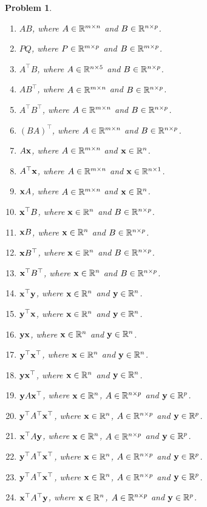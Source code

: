 \documentclass[twocolumn]{article}
\newtheorem{prob}{Problem}
\begin{document}
\begin{prob}
\begin{enumerate}
  \item $AB$, where $A \in \mathbb{R}^{m \times n}$ and $B \in \mathbb{R}^{n \times p}$.
  \item $PQ$, where $P \in \mathbb{R}^{m \times p}$ and $B \in \mathbb{R}^{m \times p}$.
  \item $A^\top B$, where $A \in \mathbb{R}^{n \times 5}$ and $B \in \mathbb{R}^{n \times p}$.
  \item $AB^\top$, where $A \in \mathbb{R}^{m \times n}$ and $B \in \mathbb{R}^{n \times p}$.
  \item $A^\top B^\top$, where $A \in \mathbb{R}^{m \times n}$ and $B \in \mathbb{R}^{n \times p}$.
  \item $(BA)^\top$, where $A \in \mathbb{R}^{m \times n}$ and $B \in \mathbb{R}^{n \times p}$.
  \item $A\mathbf{x}$, where $A \in \mathbb{R}^{m \times n}$ and $\mathbf{x} \in \mathbb{R}^{n}$.
  \item $A^\top\mathbf{x}$, where $A \in \mathbb{R}^{m \times n}$ and $\mathbf{x} \in \mathbb{R}^{n
      \times 1}$.
  \item $\mathbf{x} A$, where $A \in \mathbb{R}^{m \times n}$ and $\mathbf{x} \in \mathbb{R}^{n}$.
  \item $\mathbf{x}^\top B$, where $\mathbf{x} \in \mathbb{R}^{n}$ and $B \in \mathbb{R}^{n \times p}$.
  \item $\mathbf{x} B$, where $\mathbf{x} \in \mathbb{R}^{n}$ and $B \in \mathbb{R}^{n \times p}$.
  \item $\mathbf{x} B^\top$, where $\mathbf{x} \in \mathbb{R}^{n}$ and $B \in \mathbb{R}^{n \times p}$.
  \item $\mathbf{x}^\top B^\top$, where $\mathbf{x} \in \mathbb{R}^{n}$ and $B \in \mathbb{R}^{n \times p}$.
  \item $\mathbf{x}^\top \mathbf{y}$, where $\mathbf{x} \in \mathbb{R}^{n}$ and $\mathbf{y} \in \mathbb{R}^{n}$.
  \item $\mathbf{y}^\top \mathbf{x}$, where $\mathbf{x} \in \mathbb{R}^{n}$ and $\mathbf{y} \in \mathbb{R}^{n}$.
  \item $\mathbf{y} \mathbf{x}$, where $\mathbf{x} \in \mathbb{R}^{n}$ and $\mathbf{y} \in \mathbb{R}^{n}$.
  \item $\mathbf{y}^\top \mathbf{x}^\top$, where $\mathbf{x} \in \mathbb{R}^{n}$ and $\mathbf{y} \in \mathbb{R}^{n}$.
  \item $\mathbf{y} \mathbf{x}^\top$, where $\mathbf{x} \in \mathbb{R}^{n}$ and $\mathbf{y} \in \mathbb{R}^{n}$.
  \item $\mathbf{y} A \mathbf{x}^\top$, where $\mathbf{x} \in \mathbb{R}^{n}$, $A \in \mathbb{R}^{n \times p}$ and $\mathbf{y} \in \mathbb{R}^{p}$.
  \item $\mathbf{y}^\top A^\top \mathbf{x}^\top$, where $\mathbf{x} \in \mathbb{R}^{n}$, $A \in \mathbb{R}^{n \times p}$ and $\mathbf{y} \in \mathbb{R}^{p}$.
  \item $\mathbf{x}^\top A     \mathbf{y}    $, where $\mathbf{x} \in \mathbb{R}^{n}$, $A \in \mathbb{R}^{n \times p}$ and $\mathbf{y} \in \mathbb{R}^{p}$.
  \item $\mathbf{y}^\top A^\top \mathbf{x}^\top$, where $\mathbf{x} \in \mathbb{R}^{n}$, $A \in \mathbb{R}^{n \times p}$ and $\mathbf{y} \in \mathbb{R}^{p}$.
  \item $\mathbf{y}^\top A^\top \mathbf{x}^\top$, where $\mathbf{x} \in \mathbb{R}^{n}$, $A \in \mathbb{R}^{n \times p}$ and $\mathbf{y} \in \mathbb{R}^{p}$.
  \item $\mathbf{x}^\top A^\top \mathbf{y}$, where $\mathbf{x} \in \mathbb{R}^{n}$, $A \in \mathbb{R}^{n \times p}$ and $\mathbf{y} \in \mathbb{R}^{p}$.
  \end{enumerate}
\end{prob}
\newpage
\end{document}
